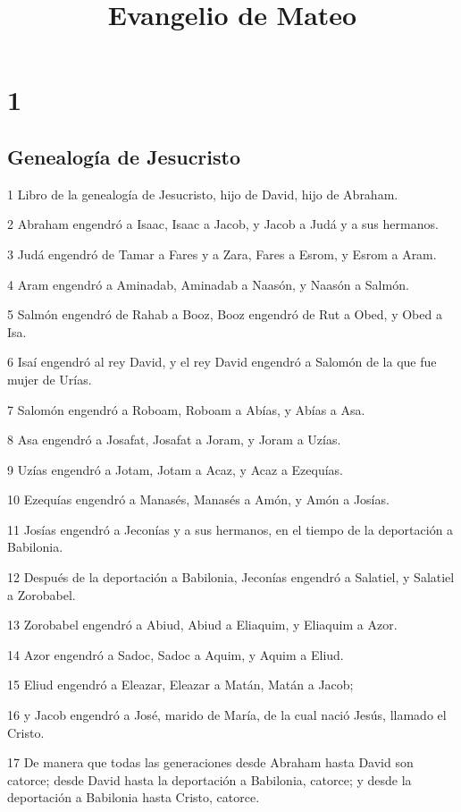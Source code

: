 
\title{Evangelio de Mateo}

\chapter{1}

\section*{Genealogía de Jesucristo}

\par 1 Libro de la genealogía de Jesucristo, hijo de David, hijo de Abraham.
\par 2 Abraham engendró a Isaac, Isaac a Jacob, y Jacob a Judá y a sus hermanos.
\par 3 Judá engendró de Tamar a Fares y a Zara, Fares a Esrom, y Esrom a Aram.
\par 4 Aram engendró a Aminadab, Aminadab a Naasón, y Naasón a Salmón.
\par 5 Salmón engendró de Rahab a Booz, Booz engendró de Rut a Obed, y Obed a Isa.
\par 6 Isaí engendró al rey David, y el rey David engendró a Salomón de la que fue mujer de Urías.
\par 7 Salomón engendró a Roboam, Roboam a Abías, y Abías a Asa.
\par 8 Asa engendró a Josafat, Josafat a Joram, y Joram a Uzías.
\par 9 Uzías engendró a Jotam, Jotam a Acaz, y Acaz a Ezequías.
\par 10 Ezequías engendró a Manasés, Manasés a Amón, y Amón a Josías.
\par 11 Josías engendró a Jeconías y a sus hermanos, en el tiempo de la deportación a Babilonia.
\par 12 Después de la deportación a Babilonia, Jeconías engendró a Salatiel, y Salatiel a Zorobabel.
\par 13 Zorobabel engendró a Abiud, Abiud a Eliaquim, y Eliaquim a Azor.
\par 14 Azor engendró a Sadoc, Sadoc a Aquim, y Aquim a Eliud.
\par 15 Eliud engendró a Eleazar, Eleazar a Matán, Matán a Jacob;
\par 16 y Jacob engendró a José, marido de María, de la cual nació Jesús, llamado el Cristo.
\par 17 De manera que todas las generaciones desde Abraham hasta David son catorce; desde David hasta la deportación a Babilonia, catorce; y desde la deportación a Babilonia hasta Cristo, catorce.

